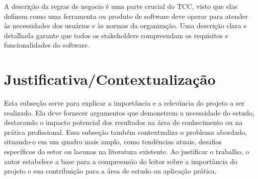 A descrição da regras de negocio é uma parte crucial do TCC, visto que elas definem como uma ferramenta ou produto de software deve operar para atender às necessidades dos usuários e às normas da organização. Uma descrição clara e detalhada garante que todos os stakeholders compreendam os requisitos e funcionalidades do software.


\section{Justificativa/Contextualização}

Esta subseção serve para explicar a importância e a relevância do projeto a ser realizado. Ela deve fornecer argumentos que demonstrem a necessidade do estudo, destacando o impacto potencial dos resultados na área de conhecimento ou na prática profissional. Essa subseção também contextualiza o problema abordado, situando-o em um quadro mais amplo, como tendências atuais, desafios específicos do setor ou lacunas na literatura existente. Ao justificar o trabalho, o autor estabelece a base para a compreensão do leitor sobre a importância do projeto e sua contribuição para a área de estudo ou aplicação prática.